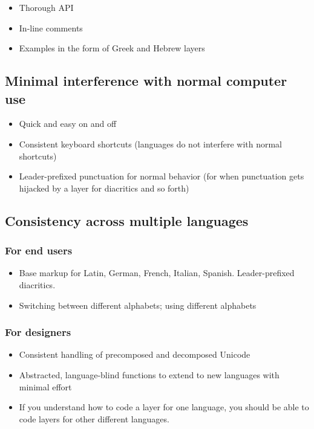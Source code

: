 \documentclass[11pt]{article}
\begin{document}
\begin{itemize}
\item Thorough API
\item In-line comments
\item Examples in the form of Greek and Hebrew layers
\end{itemize}

\subsection{Minimal interference with normal computer use}
\label{sec:org6d75b8f}

\begin{itemize}
\item Quick and easy on and off
\item Consistent keyboard shortcuts (languages do not interfere with normal shortcuts)
\item Leader-prefixed punctuation for normal behavior (for when punctuation gets hijacked by a layer for diacritics and so forth)
\end{itemize}

\subsection{Consistency across multiple languages}
\label{sec:orge6bf43b}

\subsubsection{For end users}
\label{sec:org19c858e}

\begin{itemize}
\item Base markup for Latin, German, French, Italian, Spanish. Leader-prefixed diacritics.
\item Switching between different alphabets; using different alphabets
\end{itemize}

\subsubsection{For designers}
\label{sec:org04a6f5e}

\begin{itemize}
\item Consistent handling of precomposed and decomposed Unicode
\item Abstracted, language-blind functions to extend to new languages with minimal effort
\item If you understand how to code a layer for one language, you should be able to code layers for other different languages.
\end{itemize}
\end{document}
